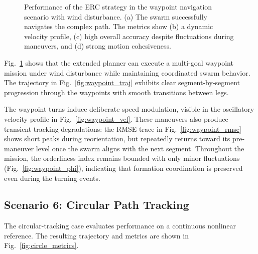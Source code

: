 \documentclass[pdflatex,sn-basic]{sn-jnl}%
\begin{document}
\begin{figure}
            \caption{Performance of the ERC strategy in the waypoint navigation scenario with wind disturbance. (a) The swarm successfully navigates the complex path. The metrics show (b) a dynamic velocity profile, (c) high overall accuracy despite fluctuations during maneuvers, and (d) strong motion cohesiveness.}
            \label{fig:waypoint_metrics}
        \end{figure}

        Fig.~\ref{fig:waypoint_metrics} shows that the extended planner can execute a multi-goal waypoint mission under wind disturbance while maintaining coordinated swarm behavior. The trajectory in Fig.~\ref{fig:waypoint_traj} exhibits clear segment-by-segment progression through the waypoints with smooth transitions between legs.

        The waypoint turns induce deliberate speed modulation, visible in the oscillatory velocity profile in Fig.~\ref{fig:waypoint_vel}. These maneuvers also produce transient tracking degradations: the RMSE trace in Fig.~\ref{fig:waypoint_rmse} shows short peaks during reorientation, but repeatedly returns toward its pre-maneuver level once the swarm aligns with the next segment. Throughout the mission, the orderliness index remains bounded with only minor fluctuations (Fig.~\ref{fig:waypoint_phi}), indicating that formation coordination is preserved even during the turning events.

    \subsection{Scenario 6: Circular Path Tracking}
        The circular-tracking case evaluates performance on a continuous nonlinear reference. The resulting trajectory and metrics are shown in Fig.~\ref{fig:circle_metrics}.
\end{document}
